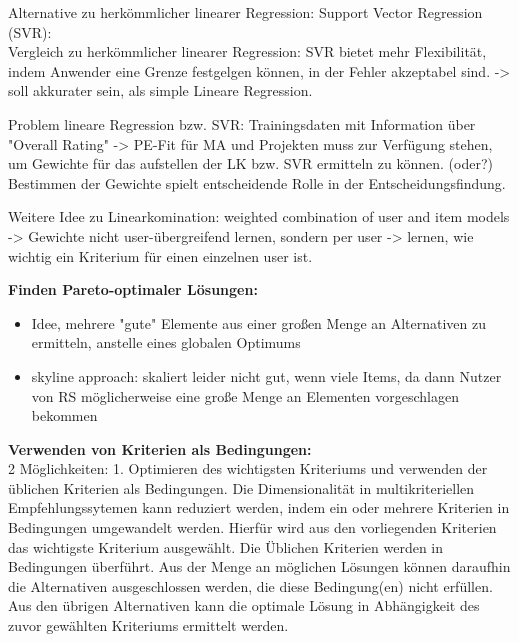 Alternative zu herkömmlicher linearer Regression:
Support Vector Regression (SVR):\\ %
Vergleich zu herkömmlicher linearer Regression: SVR bietet mehr Flexibilität, indem Anwender eine Grenze festgelgen können, in der Fehler akzeptabel sind.
-> soll akkurater sein, als simple Lineare Regression. %

Problem lineare Regression bzw. SVR: Trainingsdaten mit Information über "Overall Rating" -> PE-Fit für MA und Projekten muss zur Verfügung stehen, um Gewichte für das aufstellen der LK bzw. SVR ermitteln zu können. (oder?)
Bestimmen der Gewichte spielt entscheidende Rolle in der Entscheidungsfindung. %

Weitere Idee zu Linearkomination: weighted combination of user and item models -> Gewichte nicht user-übergreifend lernen, sondern per user -> lernen, wie wichtig ein Kriterium für einen einzelnen user ist. %

\textbf{Finden Pareto-optimaler Lösungen:}
\begin{itemize}
    \item Idee, mehrere "gute" Elemente aus einer großen Menge an Alternativen zu ermitteln, anstelle eines globalen Optimums %
    \item skyline approach: skaliert leider nicht gut, wenn viele Items, da dann Nutzer von RS möglicherweise eine große Menge an Elementen vorgeschlagen bekommen %
\end{itemize}

\textbf{Verwenden von Kriterien als Bedingungen:}\\
2 Möglichkeiten:
1. Optimieren des wichtigsten Kriteriums und verwenden der üblichen Kriterien als Bedingungen.
Die Dimensionalität in multikriteriellen Empfehlungssytemen kann reduziert werden, indem ein oder mehrere Kriterien in Bedingungen umgewandelt werden.%
Hierfür wird aus den vorliegenden Kriterien das wichtigste Kriterium ausgewählt.
Die Üblichen Kriterien werden in Bedingungen überführt.
Aus der Menge an möglichen Lösungen können daraufhin die Alternativen ausgeschlossen werden, die diese Bedingung(en) nicht erfüllen.
Aus den übrigen Alternativen kann die optimale Lösung in Abhängigkeit des zuvor gewählten Kriteriums ermittelt werden.

